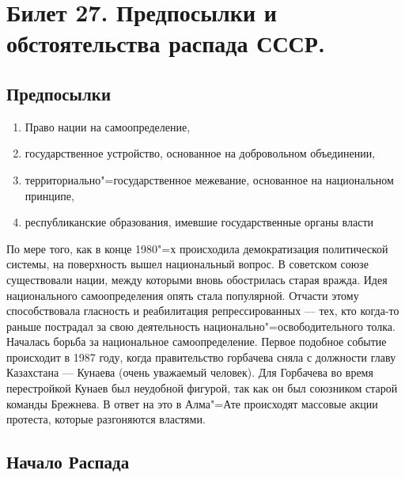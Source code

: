 \section{Билет 27. Предпосылки и обстоятельства распада СССР.}

\subsection{Предпосылки}
\begin{enumerate}
    \item Право нации на самоопределение, 
    \item государственное устройство, основанное на добровольном объединении, 
    \item территориально"=государственное межевание, основанное на национальном принципе, 
    \item республиканские образования, имевшие государственные органы власти
\end{enumerate}

По мере того, как в конце 1980"=х происходила демократизация политической системы, на поверхность вышел национальный вопрос. В советском союзе существовали нации, между которыми вновь обострилась старая вражда. Идея национального самоопределения опять стала популярной. Отчасти этому способствовала гласность и реабилитация репрессированных --- тех, кто когда-то раньше пострадал за свою деятельность национально"=освободительного толка. Началась борьба за национальное самоопределение. Первое подобное событие происходит в 1987 году, когда правительство горбачева сняла с должности главу Казахстана --- Кунаева (очень уважаемый человек). Для Горбачева во время перестройкой Кунаев был неудобной фигурой, так как он был союзником старой команды Брежнева. В ответ на это в Алма"=Ате происходят массовые акции протеста, которые разгоняются властями. 

\subsection{Начало Распада} 

